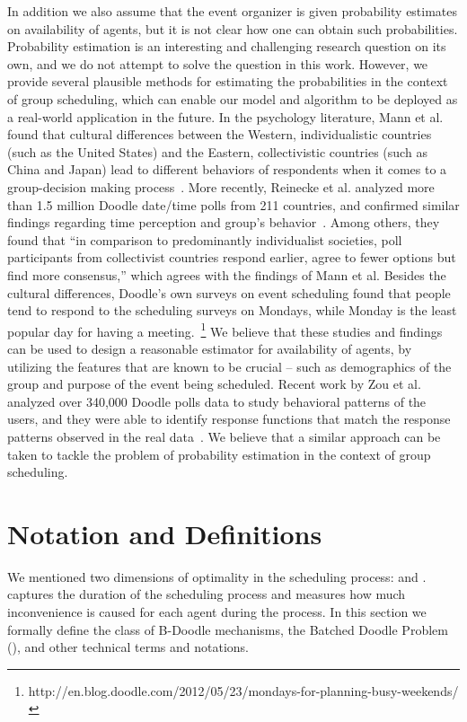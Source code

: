In addition we also  assume that the event organizer is given probability estimates on availability of agents, but it is not clear how one can obtain such probabilities. 
 Probability estimation is an interesting and challenging research question on its own, and we do not attempt to solve the question in this work. However, we provide several plausible methods for estimating the probabilities in the context of group scheduling, which can enable our model and algorithm to be deployed as a real-world application in the future.
 In the psychology literature, Mann et al. found that cultural differences between the Western, individualistic countries (such as the United States) and the Eastern, collectivistic countries (such as China and Japan) lead to different behaviors of respondents when it comes to a group-decision making process~\cite{mann1998cross}.
 More recently, Reinecke et al. analyzed more than 1.5 million Doodle date/time polls from 211 countries, and confirmed similar findings regarding time perception and group's behavior~\cite{reinecke2013doodle}. Among others, they found that ``in comparison to predominantly individualist societies, poll participants from collectivist countries respond earlier, agree to fewer options but find more consensus,'' which agrees with the findings of Mann et al.
 Besides the cultural differences, Doodle's own surveys on event scheduling found that people tend to respond to the scheduling surveys on Mondays, while Monday is the least popular day for having a meeting.~\footnote{http://en.blog.doodle.com/2012/05/23/mondays-for-planning-busy-weekends/}
 We believe that these studies and findings can be used to design a reasonable estimator for availability of agents, by utilizing the features that are known to be crucial -- such as demographics of the group and purpose of the event being scheduled.
 Recent work by Zou et al. analyzed over 340,000 Doodle polls data to study behavioral patterns of the users, and they were able to identify response functions that match the response patterns observed in the real data~\cite{zou2015strategic}. We believe that a similar approach can be taken to tackle the problem of probability estimation in the context of group scheduling.


\section{Notation and Definitions}

We mentioned two dimensions of optimality in the scheduling process: \Times and \Inconvenience.
\Times captures the duration of the scheduling process and \Inconveniences measures how much inconvenience is caused for each agent during the process.
In this section we formally define the class of B-Doodle mechanisms, the Batched Doodle Problem (\BDP), and other technical terms and notations.


